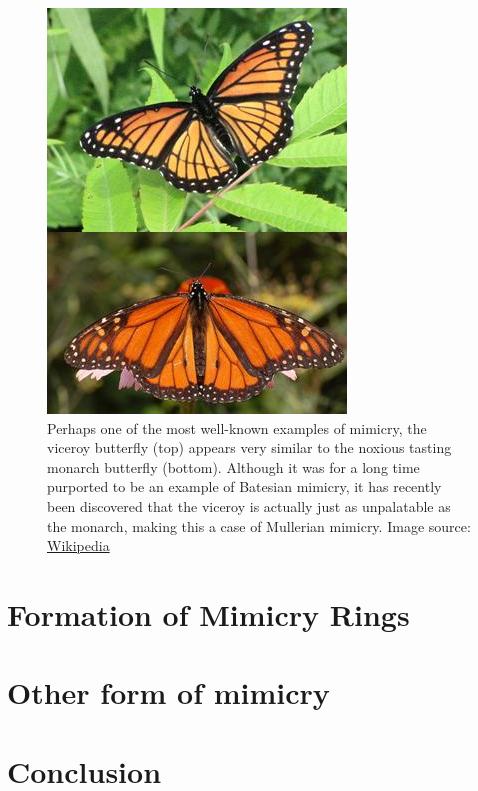 \begin{figure}[H]
	\centering
	\includegraphics[scale=0.75]{images/BatesMimButter}
	\caption{Perhaps one of the most well-known examples of mimicry, the viceroy butterfly (top) appears very similar to the noxious tasting monarch butterfly (bottom). Although it was for a long time purported to be an example of Batesian mimicry, it has recently been discovered that the viceroy is actually just as unpalatable as the monarch, making this a case of Mullerian mimicry. \cite{brower1991} Image source: \href{http://en.wikipedia.org/wiki/Mullerian_mimicry}{Wikipedia}}
	\label{fig:mullerian-butterfly}
\end{figure}

\section{Formation of Mimicry Rings}

\section{Other form of mimicry}

\section{Conclusion}